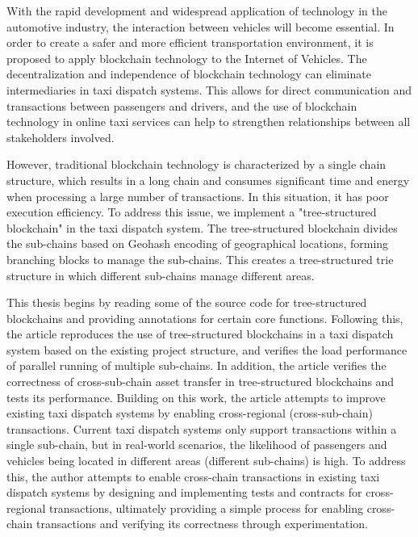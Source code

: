 \begin{abstract*}
    With the rapid development and widespread application of technology in the automotive industry, the interaction between vehicles will become essential. In order to create a safer and more efficient transportation environment, it is proposed to apply blockchain technology to the Internet of Vehicles. The decentralization and independence of blockchain technology can eliminate intermediaries in taxi dispatch systems. This allows for direct communication and transactions between passengers and drivers, and the use of blockchain technology in online taxi services can help to strengthen relationships between all stakeholders involved.
    
    However, traditional blockchain technology is characterized by a single chain structure, which results in a long chain and consumes significant time and energy when processing a large number of transactions. In this situation, it has poor execution efficiency. To address this issue, we implement a "tree-structured blockchain" in the taxi dispatch system. The tree-structured blockchain divides the sub-chains based on Geohash encoding of geographical locations, forming branching blocks to manage the sub-chains. This creates a tree-structured trie structure in which different sub-chains manage different areas.
    
    This thesis begins by reading some of the source code for tree-structured blockchains and providing annotations for certain core functions. Following this, the article reproduces the use of tree-structured blockchains in a taxi dispatch system based on the existing project structure, and verifies the load performance of parallel running of multiple sub-chains. In addition, the article verifies the correctness of cross-sub-chain asset transfer in tree-structured blockchains and tests its performance. Building on this work, the article attempts to improve existing taxi dispatch systems by enabling cross-regional (cross-sub-chain) transactions. Current taxi dispatch systems only support transactions within a single sub-chain, but in real-world scenarios, the likelihood of passengers and vehicles being located in different areas (different sub-chains) is high. To address this, the author attempts to enable cross-chain transactions in existing taxi dispatch systems by designing and implementing tests and contracts for cross-regional transactions, ultimately providing a simple process for enabling cross-chain transactions and verifying its correctness through experimentation.

\end{abstract*}
